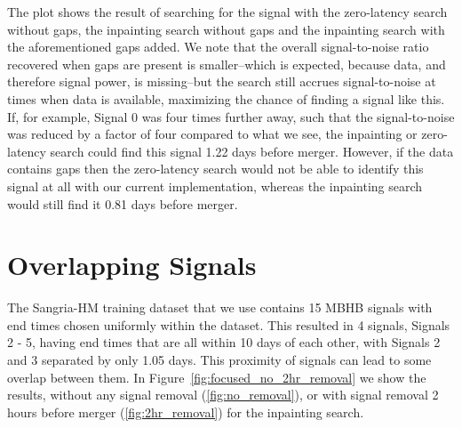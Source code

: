 \documentclass[%
 reprint,
superscriptaddress,
 nofootinbib,
 amsmath,amssymb,
 aps,
 prd,
]{revtex4-2}
\begin{document}
The plot shows the result of searching for the signal with the zero-latency search without gaps, the inpainting search without gaps and the inpainting search with the aforementioned gaps added.
We note that the overall signal-to-noise ratio recovered when gaps are present is smaller--which is expected, because data, and therefore signal power, is missing--but the search still accrues signal-to-noise at times when data is available, maximizing the chance of finding a signal like this.
If, for example, Signal 0 was four times further away, such that the signal-to-noise was reduced by a factor of four compared to what we see, the inpainting or zero-latency search could find this signal 1.22 days before merger.
However, if the data contains gaps then the zero-latency search would not be able to identify this 
signal at all with our current implementation, whereas the inpainting search would still find it 0.81 days before merger.

\section{Overlapping Signals}
\label{sec:focused}

The Sangria-HM training dataset that we use contains 15 MBHB signals with end times chosen uniformly within the dataset.
This resulted in 4 signals, Signals 2 - 5, having end times that are all within 10 days of each other, with Signals 2 and 3 separated by only 1.05 days.
This proximity of signals can lead to some overlap between them.
In Figure~\ref{fig:focused_no_2hr_removal} we show the results, without any signal removal (\ref{fig:no_removal}), or with signal removal 2 hours before merger (\ref{fig:2hr_removal}) for the inpainting search.
\end{document}
